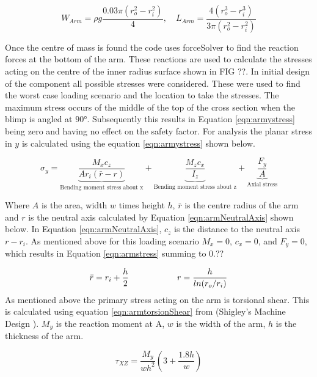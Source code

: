 \documentclass[../main.tex]{subfiles}
\begin{document}
\begin{equation} \label{eqn:armCg}
W_{Arm} = \rho g\frac{0.03\pi(r_o^2 - r_i^2)}{4}, \quad L_{Arm} =\frac{4(r_o^3 - r_i^3)}{3\pi(r_o^2 - r_i^2)}
\end{equation}

Once the centre of mass is found the code uses forceSolver to find the reaction forces at the bottom of the arm. These reactions are used to calculate the stresses acting on the centre of the inner radius surface shown in FIG ??. In initial design of the component all possible stresses were considered. These were used to find the worst case loading scenario and the location to take the stresses. The maximum stress occurs of the middle of the top of the cross section when the blimp is angled at $90°$. Subsequently this results in Equation \ref{eqn:armystress} being zero and having no effect on the safety factor. For analysis the planar stress in $y$ is calculated using the equation \ref{eqn:armystress} shown below. 

\begin{equation}
\label{eqn:armstress}
\sigma_{y}=  \underbrace{\frac{M_{x}c_z}{A r_i (\bar{r} - r)}}_\text{Bending moment stress about x} + \underbrace{\frac{M_{z}c_x}{I_z}}_\text{Bending moment stress about z} + \underbrace{\frac{F_y}{A}}_\text{Axial stress} 
\end{equation}

Where $A$ is the area, width $w$ times height $h$, $\bar{r}$ is the centre radius of the arm and $r$ is the neutral axis calculated by Equation \ref{eqn:armNeutralAxis} shown below. In Equation \ref{eqn:armNeutralAxis}, $c_z$ is the distance to the neutral axis $r - r_i$. As mentioned above for this loading scenario $M_x = 0$, $c_x = 0$, and $F_y = 0$, which results in Equation \ref{eqn:armstress} summing to 0.??

\begin{equation} \label{eqn:armNeutralAxis}
\bar{r} = r_i + \frac{h}{2} \hspace{20mm}  r = \frac{h}{ln(r_o/r_i)}
\end{equation}
As mentioned above the primary stress acting on the arm is torsional shear. This is calculated using equation \ref{eqn:armtorsionShear} from {(Shigley's Machine Design \cite[102]{shigley})}. $M_y$ is the reaction moment at A, $w$ is the width of the arm, $h$ is the thickness of the arm.

\begin{equation} \label{eqn:armtorsionShear}
\tau_{XZ} = \dfrac{M_{y}}{wh^2}(3+\frac{1.8h}{w})
\end{equation}
\end{document}
